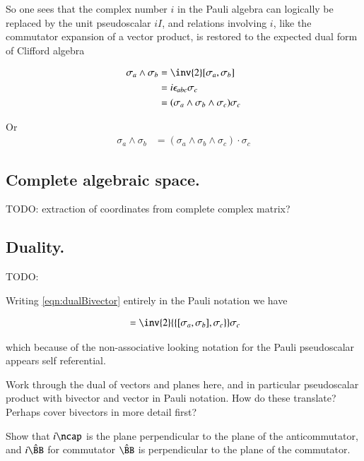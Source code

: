 \documentclass{article}
\newcommand{\symmetric}[2]{{\{{#1},{#2}\}}}
\newcommand{\antisymmetric}[2]{[{#1},{#2}]}
\newcommand{\Bcap}[0]{\hat{\BB}}
\begin{document}
So one sees that the complex number $i$ in the Pauli algebra can logically be
replaced by the unit pseudoscalar $i I$, and relations involving $i$, like the 
commutator expansion of a vector product, is restored to the expected
dual form of Clifford algebra

\begin{align*}
\sigma_a \wedge \sigma_b 
&= \inv{2} \antisymmetric{\sigma_a}{\sigma_b} \\
&= i \epsilon_{a b c} \sigma_c \\
&= (\sigma_a \wedge \sigma_b \wedge \sigma_c) \sigma_c \\
\end{align*}

Or
\begin{align}\label{eqn:dualBivector}
\sigma_a \wedge \sigma_b &= (\sigma_a \wedge \sigma_b \wedge \sigma_c) \cdot \sigma_c
\end{align}

\subsection{ Complete algebraic space. }

TODO: extraction of coordinates from complete complex matrix?

\subsection{ Duality. }

TODO: 

Writing \ref{eqn:dualBivector} entirely in the Pauli notation we have

\begin{align*}
\antisymmetric{\sigma_a}{\sigma_b} 
&= \inv{2} \symmetric{\antisymmetric{\sigma_a}{\sigma_b}}{\sigma_c} \sigma_c \\
\end{align*}

which because of the non-associative looking notation for the Pauli pseudoscalar appears self referential.

Work through the dual of vectors and planes here, and in particular 
pseudoscalar product with bivector and vector in Pauli notation.  How do these
translate?  Perhaps cover bivectors in more detail first?

Show that $i \ncap$ is the plane perpendicular to the plane of the anticommutator, and $i \Bcap$ for commutator $\Bcap$ is perpendicular to the plane of the commutator.
\end{document}
